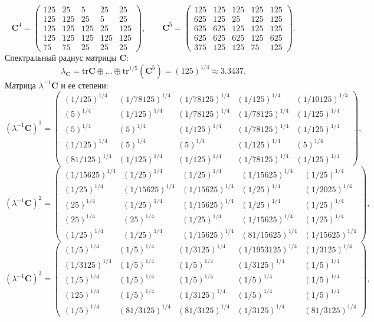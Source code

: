 $$\bm{C}^4 = \begin{pmatrix}
125 & 25 & 5 & 25 & 25\\
125 & 125 & 25 & 5 & 25\\
125 & 125 & 125 & 25 & 125\\
125 & 125 & 125 & 125 & 125\\
75 & 75 & 25 & 25 & 25
\end{pmatrix},
\qquad
\bm{C}^5 = \begin{pmatrix}
125 & 125 & 125 & 125 & 125\\
625 & 125 & 25 & 125 & 125\\
625 & 625 & 125 & 125 & 125\\
625 & 625 & 625 & 125 & 625\\
375 & 125 & 125 & 75 & 125
\end{pmatrix}.
$$
Спектральный радиус матрицы $\bm{C}$:
$$\lambda_{\bm{C}} = \mathrm{tr}\bm{C}\oplus \dots \oplus \mathrm{tr}^{1/5}(\bm{C}^{5}) = (125)^{1/4} \approx 3.3437.$$
Матрица $\lambda^{-1}\bm{C}$ и ее степени:
$$(\lambda^{-1}\bm{C})^1 = \begin{pmatrix}
(1/125)^{1/4} & (1/78125)^{1/4} & (1/78125)^{1/4} & (1/125)^{1/4} & (1/10125)^{1/4}\\
(5)^{1/4} & (1/125)^{1/4} & (1/78125)^{1/4} & (1/78125)^{1/4} & (1/125)^{1/4}\\
(5)^{1/4} & (5)^{1/4} & (1/125)^{1/4} & (1/78125)^{1/4} & (1/125)^{1/4}\\
(1/125)^{1/4} & (5)^{1/4} & (5)^{1/4} & (1/125)^{1/4} & (5)^{1/4}\\
(81/125)^{1/4} & (1/125)^{1/4} & (1/125)^{1/4} & (1/78125)^{1/4} & (1/125)^{1/4}
\end{pmatrix},
$$
$$(\lambda^{-1}\bm{C})^2 = \begin{pmatrix}
(1/15625)^{1/4} & (1/25)^{1/4} & (1/25)^{1/4} & (1/15625)^{1/4} & (1/25)^{1/4}\\
(1/25)^{1/4} & (1/15625)^{1/4} & (1/15625)^{1/4} & (1/25)^{1/4} & (1/2025)^{1/4}\\
(25)^{1/4} & (1/25)^{1/4} & (1/15625)^{1/4} & (1/25)^{1/4} & (1/25)^{1/4}\\
(25)^{1/4} & (25)^{1/4} & (1/25)^{1/4} & (1/15625)^{1/4} & (1/25)^{1/4}\\
(1/25)^{1/4} & (1/25)^{1/4} & (1/15625)^{1/4} & (81/15625)^{1/4} & (1/15625)^{1/4}
\end{pmatrix},
$$
$$(\lambda^{-1}\bm{C})^3 = \begin{pmatrix}
(1/5)^{1/4} & (1/5)^{1/4} & (1/3125)^{1/4} & (1/1953125)^{1/4} & (1/3125)^{1/4}\\
(1/3125)^{1/4} & (1/5)^{1/4} & (1/5)^{1/4} & (1/3125)^{1/4} & (1/5)^{1/4}\\
(1/5)^{1/4} & (1/5)^{1/4} & (1/5)^{1/4} & (1/5)^{1/4} & (1/5)^{1/4}\\
(125)^{1/4} & (1/5)^{1/4} & (1/3125)^{1/4} & (1/5)^{1/4} & (1/5)^{1/4}\\
(1/5)^{1/4} & (81/3125)^{1/4} & (81/3125)^{1/4} & (1/3125)^{1/4} & (81/3125)^{1/4}
\end{pmatrix},
$$
